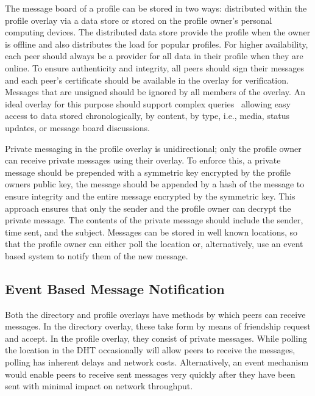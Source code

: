 \documentclass[conference]{IEEEtran}
\begin{document}
The message board of a profile can be stored in two ways: distributed within
the profile overlay via a data store or stored on the profile owner's personal
computing devices.  The distributed data store provide the profile when the
owner is offline and also distributes the load for popular profiles.  For
higher availability, each peer should always be a provider for all data in
their profile when they are online.  To ensure authenticity and integrity, all
peers should sign their messages and each peer's certificate should be
available in the overlay for verification.  Messages that are unsigned should
be ignored by all members of the overlay.  An ideal overlay for this purpose
should support complex queries~\cite{complex_queries} allowing easy access to
data stored chronologically, by content, by type, i.e., media, status updates,
or message board discussions.

Private messaging in the profile overlay is unidirectional; only the profile
owner can receive private messages using their overlay.  To enforce this, a
private message should be prepended with a symmetric key encrypted by the
profile owners public key, the message should be appended by a hash of the
message to ensure integrity and the entire message encrypted by the symmetric
key.  This approach ensures that only the sender and the profile owner can
decrypt the private message.  The contents of the private message should
include the sender, time sent, and the subject.  Messages can be stored in well
known locations, so that the profile owner can either poll the location or,
alternatively, use an event based system to notify them of the new message.

\subsection{Event Based Message Notification}

Both the directory and profile overlays have methods by which peers can receive
messages.  In the directory overlay, these take form by means of friendship
request and accept.  In the profile overlay, they consist of private messages.
While polling the location in the DHT occasionally will allow peers to
receive the messages, polling has inherent delays and network costs.
Alternatively, an event mechanism would enable peers to receive sent messages
very quickly after they have been sent with minimal impact on network
throughput.
\end{document}
